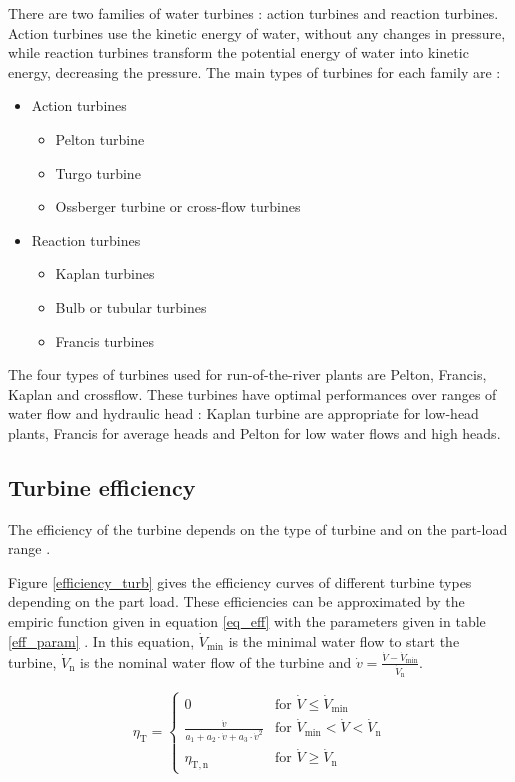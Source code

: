 There are two families of water turbines : action turbines and reaction turbines. Action turbines use the kinetic energy of water, without any changes in pressure, while reaction turbines transform the potential energy of water into kinetic energy, decreasing the pressure. The main types of turbines for each family are \cite{quaschning} :
\begin{itemize}
 \item Action turbines
 \begin{itemize}
  \item Pelton turbine
  \item Turgo turbine
  \item Ossberger turbine or cross-flow turbines
 \end{itemize}
 \item Reaction turbines
 \begin{itemize}
  \item Kaplan turbines
  \item Bulb or tubular turbines
  \item Francis turbines
 \end{itemize}
\end{itemize}

The four types of turbines used for run-of-the-river plants are Pelton, Francis, Kaplan and crossflow. These turbines have optimal performances over ranges of water flow and hydraulic head : Kaplan turbine are appropriate for low-head plants, Francis for average heads and Pelton for low water flows and high heads.   

\subsection{Turbine efficiency}

The efficiency of the turbine depends on the type of turbine and on the part-load range \cite{quaschning}\cite{pacer}. 

Figure \ref{efficiency_turb} gives the efficiency curves of different turbine types depending on the part load. These efficiencies can be approximated by the empiric function given in equation \ref{eq_eff} with the parameters given in table \ref{eff_param} \cite{quaschning}. In this equation, $\dot{V}_\mathrm{min}$ is the minimal water flow to start the turbine, $\dot{V}_\mathrm{n}$ is the nominal water flow of the turbine and $\dot{v}=\frac{\dot{V}-\dot{V}_\mathrm{min}}{\dot{V}_\mathrm{n}}$.

\begin{equation}
 \label{eq_eff}
\eta_\mathrm{T}= \left\{
    \begin{array}{ll}
	0 & \mbox{for } \dot{V} \leq \dot{V}_\mathrm{min}\\
        \frac{\dot{v}}{a_\mathrm{1}+a_\mathrm{2} \cdot \dot{v} + a_\mathrm{3} \cdot \dot{v}^2} & \mbox{for } \dot{V}_\mathrm{min}<\dot{V}<\dot{V}_\mathrm{n} \\
        \eta_\mathrm{T,n} & \mbox{for } \dot{V} \geq \dot{V}_\mathrm{n}
    \end{array}
\right.
\end{equation}


